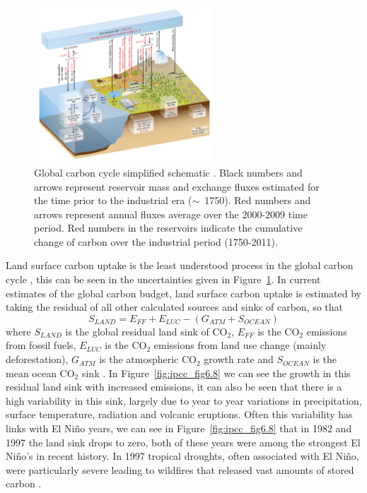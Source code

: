 \begin{figure}[ht]
    \centering
    \includegraphics[width=0.6\textwidth]{./img/intro/ipcc_fig6_1.jpg}
    \caption[Global carbon cycle simplified schematic]{Global carbon cycle simplified schematic \citep{ciais2014carbon}. Black numbers and arrows represent reservoir mass and exchange fluxes estimated for the time prior to the industrial era (\(\sim\)~1750). Red numbers and arrows represent annual fluxes average over the 2000-2009 time period. Red numbers in the reservoirs indicate the cumulative change of carbon over the industrial period (1750-2011).}
    \label{fig:ipcc_fig6.1}
\end{figure}

Land surface carbon uptake is the least understood process in the global carbon cycle \citep{ciais2014carbon}, this can be seen in the uncertainties given in Figure~\ref{fig:ipcc_fig6.1}. In current estimates of the global carbon budget, land surface carbon uptake is estimated by taking the residual of all other calculated sources and sinks of carbon, so that
\begin{equation}
S_{LAND} = E_{FF} + E_{LUC} - (G_{ATM} + S_{OCEAN})
\end{equation}  
where \(S_{LAND}\) is the global residual land sink of CO\(_{2}\), \(E_{FF}\) is the CO\(_{2}\) emissions from fossil fuels, \(E_{LUC}\) is the CO\(_{2}\) emissions from land use change (mainly deforestation), \(G_{ATM}\) is the atmospheric CO\(_{2}\) growth rate and \(S_{OCEAN}\) is the mean ocean CO\(_{2}\) sink \citep{le2015global}. In Figure~\ref{fig:ipcc_fig6.8} we can see the growth in this residual land sink with increased emissions, it can also be seen that there is a high variability in this sink, largely due to year to year variations in precipitation, surface temperature, radiation and volcanic eruptions. Often this variability has links with El Ni\~no years, we can see in Figure~\ref{fig:ipcc_fig6.8} that in 1982 and 1997 the land sink drops to zero, both of these years were among the strongest El Ni\~no's in recent history. In 1997 tropical droughts, often associated with El Ni\~no, were particularly severe leading to wildfires that released vast amounts of stored carbon \citep{schimel2013climate}.

